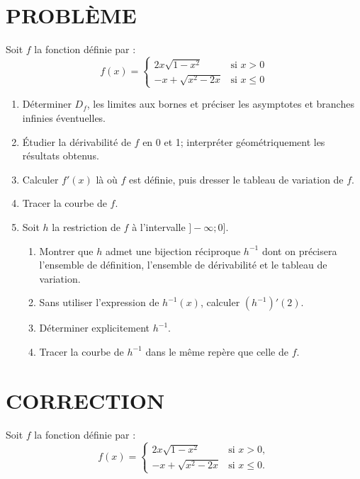 \documentclass{article}
\begin{document}
\section*{PROBLÈME}

Soit $f$ la fonction définie par :
\[
f(x) =
\begin{cases} 
2x\sqrt{1 - x^2} & \text{si } x > 0 \\ 
-x + \sqrt{x^2 - 2x} & \text{si } x \leq 0 
\end{cases}
\]

\begin{enumerate}
    \item Déterminer $D_f$, les limites aux bornes et préciser les asymptotes et branches infinies éventuelles.
    \item Étudier la dérivabilité de $f$ en 0 et 1; interpréter géométriquement les résultats obtenus.
    \item Calculer $f'(x)$ là où $f$ est définie, puis dresser le tableau de variation de $f$.
    \item Tracer la courbe de $f$.
    \item Soit $h$ la restriction de $f$ à l’intervalle $]-\infty ; 0]$.
    \begin{enumerate}
        \item Montrer que $h$ admet une bijection réciproque $h^{-1}$ dont on précisera l’ensemble de définition, l’ensemble de dérivabilité et le tableau de variation.
        \item Sans utiliser l’expression de $h^{-1}(x)$, calculer $(h^{-1})'(2)$.
        \item Déterminer explicitement $h^{-1}$.
        \item Tracer la courbe de $h^{-1}$ dans le même repère que celle de $f$.
    \end{enumerate}
\end{enumerate}
\section*{CORRECTION}
Soit \( f \) la fonction définie par :
\[
f(x) =
\begin{cases} 
2x\sqrt{1 - x^2} & \text{si } x > 0, \\ 
-x + \sqrt{x^2 - 2x} & \text{si } x \leq 0.
\end{cases}
\]
\end{document}
